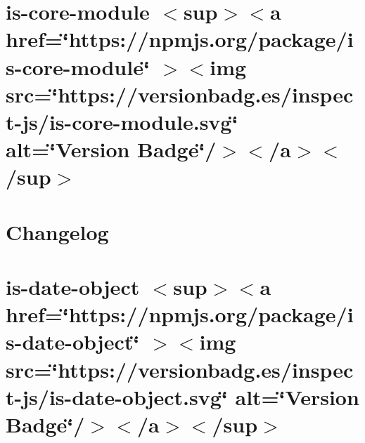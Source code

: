 \documentclass[twoside]{book}
\newcommand{\+}{\discretionary{\mbox{\scriptsize$\hookleftarrow$}}{}{}}
\begin{document}
\chapter{is-\/core-\/module \texorpdfstring{$<$}{<}sup\texorpdfstring{$>$}{>}\texorpdfstring{$<$}{<}a href=\char`\"{}https\+://npmjs.\+org/package/is-\/core-\/module\char`\"{} \texorpdfstring{$>$}{>}\texorpdfstring{$<$}{<}img src=\char`\"{}https\+://versionbadg.\+es/inspect-\/js/is-\/core-\/module.\+svg\char`\"{} alt=\char`\"{}\+Version Badge\char`\"{}/\texorpdfstring{$>$}{>}\texorpdfstring{$<$}{<}/a\texorpdfstring{$>$}{>}\texorpdfstring{$<$}{<}/sup\texorpdfstring{$>$}{>}}
\label{md__c___users_vaishnavi_jadhav__desktop__developer_code_mean_stack_example_client_node_modules_is_core_module__r_e_a_d_m_e}

\chapter{Changelog}
\label{md__c___users_vaishnavi_jadhav__desktop__developer_code_mean_stack_example_client_node_modules_ib89eaa4b6d00aa11a56b44ff01e1d7af}

\chapter{is-\/date-\/object \texorpdfstring{$<$}{<}sup\texorpdfstring{$>$}{>}\texorpdfstring{$<$}{<}a href=\char`\"{}https\+://npmjs.\+org/package/is-\/date-\/object\char`\"{} \texorpdfstring{$>$}{>}\texorpdfstring{$<$}{<}img src=\char`\"{}https\+://versionbadg.\+es/inspect-\/js/is-\/date-\/object.\+svg\char`\"{} alt=\char`\"{}\+Version Badge\char`\"{}/\texorpdfstring{$>$}{>}\texorpdfstring{$<$}{<}/a\texorpdfstring{$>$}{>}\texorpdfstring{$<$}{<}/sup\texorpdfstring{$>$}{>}}
\label{md__c___users_vaishnavi_jadhav__desktop__developer_code_mean_stack_example_client_node_modules_is_date_object__r_e_a_d_m_e}

\end{document}
